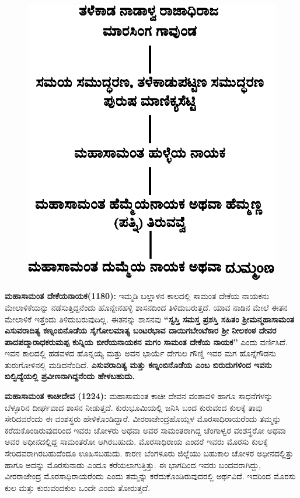 \begin{figure}[H]
\includegraphics[scale=1.2]{images/chap3/chap3fig6.jpeg}
\end{figure}

\textbf{ಮಹಾಸಾಮಂತ ದೇಕೆಯನಾಯಕ(1180):} ಇಮ್ಮಡಿ ಬಲ್ಲಾಳನ ಕಾಲದಲ್ಲಿ ಸಾಮಂತ ದೇಕೆಯ ನಾಯಕನು ಮೇಲಾಳಿಕೆ\-ಯನ್ನು ನಡೆಸುತ್ತಿದ್ದನೆಂದು ಹೊನ್ನೇನಹಳ್ಳಿ ಶಾಸನದಿಂದ ತಿಳಿದುಬರುತ್ತದೆ. ಯಾವ ನಾಡಿನ ಮೇಲೆ ಈತನ ಮೇಲಾಳಿಕೆ ಇತ್ತೆಂದು ತಿಳಿದುಬರುವುದಿಲ್ಲ. ಈತನನ್ನು ಶಾಸನವು \textbf{“ಸ್ವಸ್ತಿ ಸಮಸ್ತ ಪ್ರಶಸ್ತಿ ಸಹಿತಂ ಶ‍್ರೀಮನ್ಮಹಾಸಾಮಂತ ಎಸುವರಾದಿತ್ಯ ಕಣ್ನಂಬಿನೊಡೆಯ ಸೈಗೋಲಮಾತ್ಯ ಬಂಟರಭಾವ ದಾಯಿಗಬೇಂಟೆಕಾರ ಶ‍್ರೀ ನೀಲಕಂಠ ದೇವರ\general{\break } ಪಾದಪದ್ಮಾರಾಧಕರುಮಪ್ಪ ಕುನ್ನಿಯ ಬೀರೆಯನಾಯಕನ ಮಗಂ ಸಾಮಂತ ದೇಕೆಯ ನಾಯಕ”} ಎಂದು ವರ್ಣಿಸಿದೆ. ಇವನ ಕಾಲದಲ್ಲಿ ಹಡವಳದ ಹೊನ್ನಯ್ಯ ಮತ್ತು ಅವನ ಭಾರ್ಯೆ ದೇಗುಲ ಗೌಣ್ಡಿ ಇವರ ಮಗ ಹೊನ್ನೆಗೌಡನು ತುರುಗೋಳಿನಲ್ಲಿ ಮಡಿದ\-ನೆಂದಿದೆ. \textbf{ಎಸುವರಾದಿತ್ಯ ಮತ್ತು ಕಣ್ನಂಬಿನೊಡೆಯ ಎಂಬ ಬಿರುದುಗಳಿಂದ ಇವನು ಬಿಲ್ವಿದ್ಯೆಯಲ್ಲಿ ಪ್ರವೀಣ\-ನಾಗಿದ್ದನೆಂದು ಹೇಳಬಹುದು.}

\textbf{ಮಹಾಸಾಮಂತ ಕಾಚೀದೇವ (1224):} ಮಹಾಸಾಮಂತ ಕಾಚೀ ದೇವನ ವಂಶಾವಳಿ ಹಾಗೂ ಸಾಧನೆಗಳನ್ನು ಬೆಳ್ಳೂರಿನ ದೀರ್ಘವಾದ ಶಾಸನ ನೀಡುತ್ತದೆ. ಕುರುಭೂಮಿಯಲ್ಲಿ ಜನಿಸಿ ಬಂದ ಕುರುವಂದ ಕುಲಕ್ಕೆ ತಾವು ಸೇರಿದವರೆಂದು ಈ ವಂಶಸ್ಥರು ಹೇಳಿಕೊಂಡಿದ್ದಾರೆ. ವೀರರಾಜೇಂದ್ರಹೊಯ್ಸಳ ಮೊರಸಾಧಿರಾಯರೆಂದು ತಮ್ಮನ್ನು ಕರೆದುಕೊಂಡಿರುವುದರಿಂದ ಇವರು ಚೋಳರು ಅಥವಾ ಅವರ ಸಾಮಂತರಾಗಿದ್ದ ಚೆಂಗಾಳ್ವರ ವಂಶಸ್ಥರೋ ಅಥವಾ ಅವರ ಅಧೀನದಲ್ಲಿದ್ದ ಸಾಮಂತರೋ ಆಗಿರಬಹುದು. ಮೊರಸಾಧಿರಾಯ ಎಂದರೆ ಇವರು ಮೊರಸು ಕುಲಕ್ಕೆ ಸೇರಿದವರಾಗಿರಬಹುದೆಂದೂ ಊಹಿಸಬಹುದು. ಕಾರಣ ಬೆಂಗಳೂರು ಜಿಲ್ಲೆಯು ಬಹುಕಾಲ ಚೋಳರ ಅಧೀನದಲ್ಲಿತ್ತು ಹಾಗೂ ಅದನ್ನು ಮೊರಸುನಾಡು ಎಂದೂ ಕರೆಯಲಾಗು\-ತ್ತಿತ್ತು. ಈ ಭಾಗದಿಂದ ಇವರು ಬಂದವರಾಗಿದ್ದು, ವೀರರಾಜೇಂದ್ರ ಮೊರಸಾಧಿರಾಯರೆಂದು ಎಂದು ತಮ್ಮನ್ನು ಕರೆದುಕೊಂಡಿರು\-ವುದರಲ್ಲಿ ಅರ್ಥವಿದೆ. ಇದರಿಂದ ಮೊರಸು ಕುಲ ಮತ್ತು ಕುರುವಂದಕುಲ ಒಂದೇ ಎಂದು ತೋರುತ್ತದೆ.

